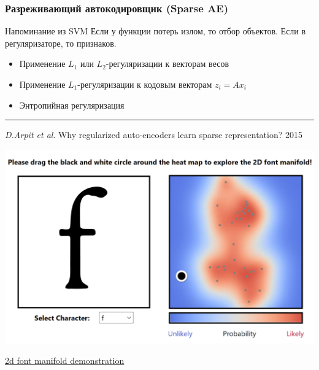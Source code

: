 \documentclass[fullscreen=true, bookmarks=true, hyperref={pdfencoding=unicode}]{beamer}
\begin{document}
\begin{frame}
  \frametitle{Разреживающий автокодировщик (Sparse AE)}

  \begin{exampleblock}{Напоминание из SVM}
    Если у функции потерь излом, то отбор объектов. Если в регуляризаторе, то признаков.
  \end{exampleblock}

  \begin{itemize}
    \item Применение $L_1$ или $L_2$-регуляризации к векторам весов
    \item Применение $L_1$-регуляризации к кодовым векторам $z_i = Ax_i$
    \item Энтропийная регуляризация
  \end{itemize}

  \vspace{1cm}
  \noindent\rule{8cm}{0.4pt}

  {\small
  {\it D.Arpit et al}. Why regularized auto-encoders learn sparse representation? 2015}
\end{frame}

\begin{frame}
  \begin{center}
    \includegraphics[keepaspectratio,
                     width=0.8\paperwidth]{2d-font-manifold.png}

  \href{https://www.ndfcampbell.org/research/fonts/}{2d font manifold demonstration}
  \end{center}
\end{frame}
\end{document}
